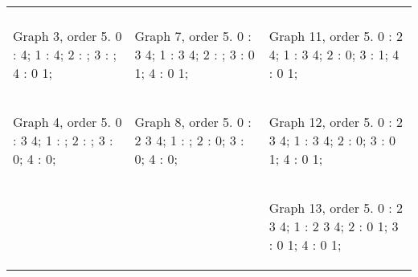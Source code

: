\begin{tabular}{|p{1.5in} | p{1.5in} | p{1.5in} |}
\begin{minipage}{1.5in}
\begin{datalisting}
\end{datalisting}
\end{minipage}
\\
\begin{minipage}{1.5in}
\begin{datalisting}
Graph 3, order 5.
0 : 4;
1 : 4;
2 : ;
3 : ;
4 : 0 1;

\end{datalisting}
\end{minipage}
&
\begin{minipage}{1.5in}
\begin{datalisting}
Graph 7, order 5.
0 : 3 4;
1 : 3 4;
2 : ;
3 : 0 1;
4 : 0 1;

\end{datalisting}
\end{minipage}
&
\begin{minipage}{1.5in}
\begin{datalisting}
Graph 11, order 5.
0 : 2 4;
1 : 3 4;
2 : 0;
3 : 1;
4 : 0 1;

\end{datalisting}
\end{minipage}
\\
\begin{minipage}{1.5in}
\begin{datalisting}
Graph 4, order 5.
0 : 3 4;
1 : ;
2 : ;
3 : 0;
4 : 0;

\end{datalisting}
\end{minipage}
&
\begin{minipage}{1.5in}
\begin{datalisting}
Graph 8, order 5.
0 : 2 3 4;
1 : ;
2 : 0;
3 : 0;
4 : 0;

\end{datalisting}
\end{minipage}
&
\begin{minipage}{1.5in}
\begin{datalisting}
Graph 12, order 5.
0 : 2 3 4;
1 : 3 4;
2 : 0;
3 : 0 1;
4 : 0 1;

\end{datalisting}
\end{minipage}
\\
&
&
\begin{minipage}{1.5in}
\begin{datalisting}
Graph 13, order 5.
0 : 2 3 4;
1 : 2 3 4;
2 : 0 1;
3 : 0 1;
4 : 0 1;

\end{datalisting}
\end{minipage}
\\
\end{tabular}


